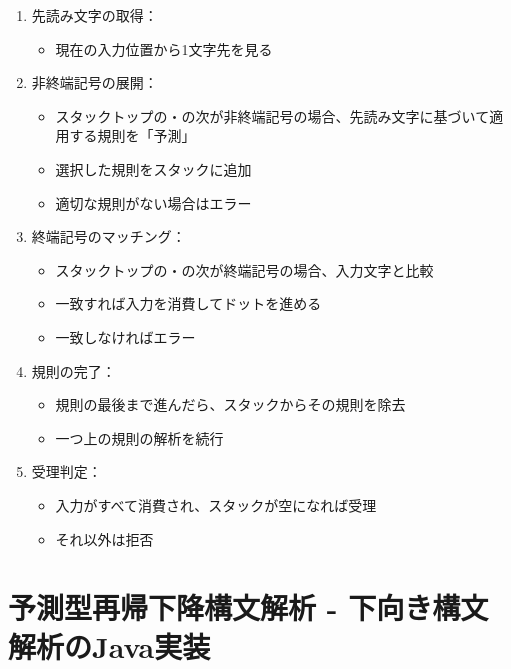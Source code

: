 \begin{enumerate}
\def\labelenumi{\arabic{enumi}.}
\tightlist
\item
  先読み文字の取得：

  \begin{itemize}
  \tightlist
  \item
    現在の入力位置から1文字先を見る
  \end{itemize}
\item
  非終端記号の展開：

  \begin{itemize}
  \tightlist
  \item
    スタックトップの・の次が非終端記号の場合、先読み文字に基づいて適用する規則を「予測」
  \item
    選択した規則をスタックに追加
  \item
    適切な規則がない場合はエラー
  \end{itemize}
\item
  終端記号のマッチング：

  \begin{itemize}
  \tightlist
  \item
    スタックトップの・の次が終端記号の場合、入力文字と比較
  \item
    一致すれば入力を消費してドットを進める
  \item
    一致しなければエラー
  \end{itemize}
\item
  規則の完了：

  \begin{itemize}
  \tightlist
  \item
    規則の最後まで進んだら、スタックからその規則を除去
  \item
    一つ上の規則の解析を続行
  \end{itemize}
\item
  受理判定：

  \begin{itemize}
  \tightlist
  \item
    入力がすべて消費され、スタックが空になれば受理
  \item
    それ以外は拒否
  \end{itemize}
\end{enumerate}

\hypertarget{chapter5-ux4e88ux6e2cux578bux518dux5e30ux4e0bux964dux69cbux6587ux89e3ux6790---ux4e0bux5411ux304dux69cbux6587ux89e3ux6790ux306ejavaux5b9fux88c5}{%
\section{予測型再帰下降構文解析 -
下向き構文解析のJava実装}\label{chapter5-ux4e88ux6e2cux578bux518dux5e30ux4e0bux964dux69cbux6587ux89e3ux6790---ux4e0bux5411ux304dux69cbux6587ux89e3ux6790ux306ejavaux5b9fux88c5}}


